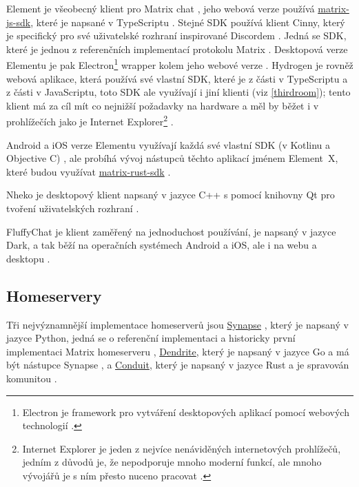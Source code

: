 Element je všeobecný klient pro Matrix chat \cite{Element-Homepage}, jeho webová
verze používá
\href{https://github.com/matrix-org/matrix-js-sdk/}{matrix-js-sdk}, které je
napsané v TypeScriptu \cite{GitHub-MatrixJSSDK}. Stejné SDK používá klient
Cinny, který je specifický pro své uživatelské rozhraní inspirované Discordem
\cite{Cinny-Homepage,GitHub-Cinny}. Jedná se SDK, které je jednou z referenčních
implementací protokolu Matrix \cite{GitHub-MatrixJSSDK}. Desktopová verze
Elementu je pak Electron\footnote{
	Electron je framework pro vytváření desktopových aplikací pomocí webových
	technologií \cite{ElectronJS-Homepage}.
} wrapper kolem jeho webové verze \cite{GitHub-ElementDesktop}. Hydrogen je
rovněž webová aplikace, která používá své vlastní SDK, které je z části v
TypeScriptu a z části v JavaScriptu, toto SDK ale využívají i jiní klienti (viz
\ref{thirdroom}); tento klient má za cíl mít co nejnižší požadavky na hardware a
měl by běžet i v prohlížečích jako je Internet Explorer\footnote{
	Internet Explorer je jeden z nejvíce nenáviděných internetových prohlížečů,
	jedním z důvodů je, že nepodporuje mnoho moderní funkcí, ale mnoho vývojářů je s
	ním přesto nuceno pracovat
	\cite{ZealousSites-WhyDoWebDevelopersHateInternetExplorer}.
} \cite{GitHub-Hydrogen}.

Android a iOS verze Elementu využívají každá své vlastní SDK (v Kotlinu a
Objective C) \cite{GitHub-ElementAndroid,GitHub-ElementIOS}, ale probíhá vývoj
nástupců těchto aplikací jménem Element~X, které budou využívat
\href{https://github.com/matrix-org/matrix-rust-sdk}{matrix-rust-sdk}
\cite{GitHub-ElementXAndroid,GitHub-ElementXIOS}.

Nheko je desktopový klient napsaný v jazyce C++ s pomocí knihovny Qt pro tvoření
uživatelských rozhraní \cite{GitHub-Nheko}.

FluffyChat je klient zaměřený na jednoduchost používání, je napsaný v jazyce
Dark, a tak běží na operačních systémech Android a iOS, ale i na webu a
desktopu \cite{FluffyChat-Homepage,GitLab-FluffyChat}.

\subsection{Homeservery}

Tři nejvýznamnější implementace homeserverů jsou
\href{https://github.com/matrix-org/synapse/}{Synapse} , který je napsaný v
jazyce Python, jedná se o referenční implementaci a historicky první
implementaci Matrix homeserveru \cite{GitHub-Synapse},
\href{https://github.com/matrix-org/dendrite/}{Dendrite}, který je napsaný v
jazyce Go a má být nástupce Synapse \cite{GitHub-Dendrite}, a
\href{https://github.com/timokoesters/conduit}{Conduit}, který je napsaný v
jazyce Rust a je spravován komunitou \cite{GitHub-Conduit}.

